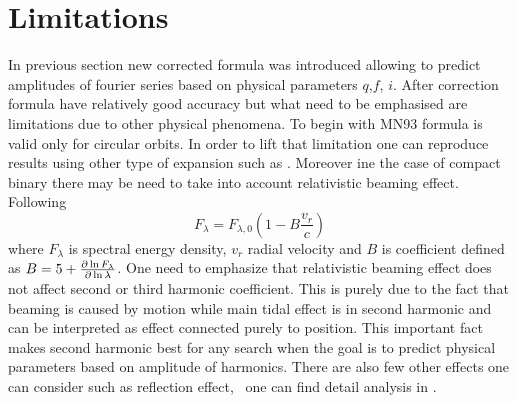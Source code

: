 \documentclass{pracalicmgr}
\begin{document}
\section{Limitations}
In previous section new corrected formula was introduced allowing to predict amplitudes of fourier series based on physical parameters $q$,$f$, $i$. After correction 
formula have relatively good accuracy but what need to be emphasised are limitations due to other physical phenomena. To begin with MN93 formula is valid only for circular orbits. 
In order to lift that limitation one can reproduce results using other type of expansion such as \citep{engel_beer_2020}. Moreover ine the case of compact binary there may be need to take into account
relativistic beaming effect. Following \citep{loeb_periodic_2003} 
\begin{equation}
    F_{\lambda}=F_{\lambda,0}\left(1-B\frac{v_r}{c}\right)
\end{equation}
where $F_\lambda$ is spectral energy density, $v_r$ radial velocity and $B$ is coefficient defined as $B=5+\pdv{\ln{F_\lambda}}{\ln{\lambda}}$.
One need to emphasize that relativistic beaming effect does not affect second or third harmonic coefficient. This is purely due to the fact that beaming is caused by motion while
main tidal effect is in second harmonic and can be interpreted as effect connected purely to position. This important fact makes second harmonic best for any search when 
the goal is to predict physical parameters based on amplitude of harmonics. There are also few other effects one can consider such as reflection effect, \
one can find detail analysis in \citep{gomel_search_2021}.
\end{document}
